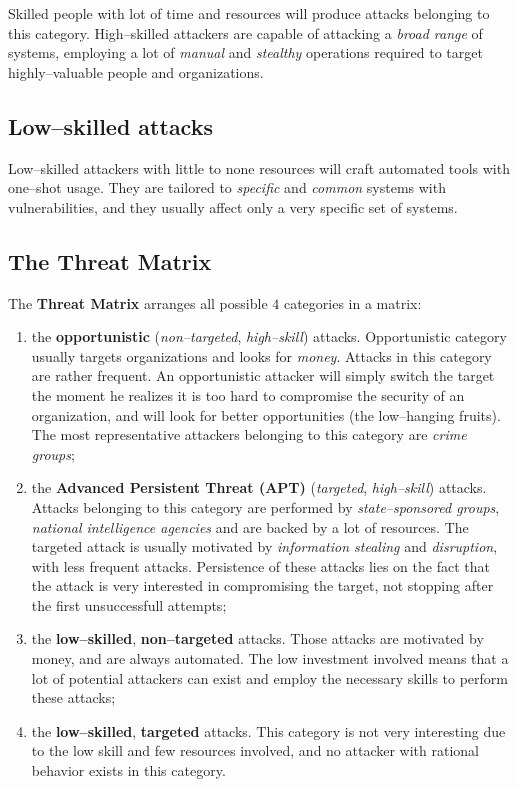 \documentclass[10pt]{extbook}
\begin{document}
Skilled people with lot of time and resources will produce attacks belonging to
this category. High--skilled attackers are capable of attacking a \emph{broad
range} of systems, employing a lot of \emph{manual} and \emph{stealthy}
operations required to target highly--valuable people and organizations.

\subsection{Low--skilled attacks}

Low--skilled attackers with little to none resources will craft automated tools
with one--shot usage. They are tailored to \emph{specific} and \emph{common}
systems with vulnerabilities, and they usually affect only a very specific set
of systems.

\subsection{The Threat Matrix}

The \textbf{Threat Matrix} arranges all possible $4$ categories in a matrix:
\begin{enumerate}
    \item the \textbf{opportunistic} (\emph{non--targeted}, \emph{high--skill})
        attacks. Opportunistic category usually targets organizations and looks
        for \emph{money}. Attacks in this category are rather frequent. An
        opportunistic attacker will simply switch the target the moment he
        realizes it is too hard to compromise the security of an organization,
        and will look for better opportunities (the low--hanging fruits). The
        most representative attackers belonging to this category are
        \emph{crime groups};
    \item the \textbf{Advanced Persistent Threat (APT)} (\emph{targeted},
        \emph{high--skill}) attacks. Attacks belonging to this category are
        performed by \emph{state--sponsored groups}, \emph{national
        intelligence agencies} and are backed by a lot of resources. The
        targeted attack is usually motivated by \emph{information stealing} and
        \emph{disruption}, with less frequent attacks. Persistence of these
        attacks lies on the fact that the attack is very interested in
        compromising the target, not stopping after the first unsuccessfull
        attempts;
    \item the \textbf{low--skilled}, \textbf{non--targeted} attacks. Those
        attacks are motivated by money, and are always automated. The low
        investment involved means that a lot of potential attackers can exist
        and employ the necessary skills to perform these attacks;
    \item the \textbf{low--skilled}, \textbf{targeted} attacks. This category
        is not very interesting due to the low skill and few resources
        involved, and no attacker with rational behavior exists in this
        category.
\end{enumerate}
\end{document}
